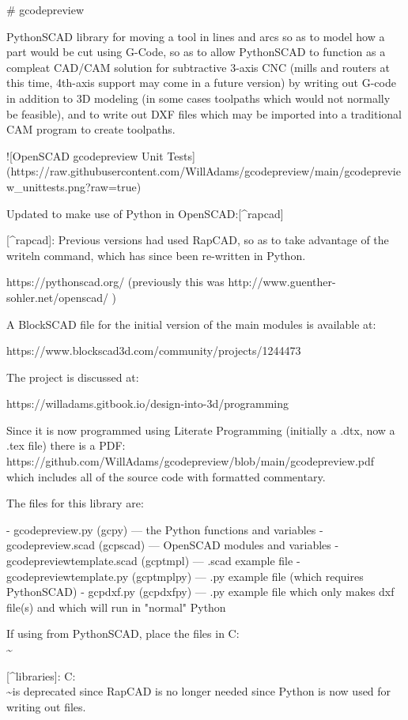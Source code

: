 \documentclass{ltxdoc}
\begin{document}
\begin{readme}
# gcodepreview

PythonSCAD library for moving a tool in lines and arcs so as to model how a part would be cut using G-Code, so as to allow PythonSCAD to function as a compleat CAD/CAM solution for subtractive 3-axis CNC (mills and routers at this time, 4th-axis support may come in a future version) by writing out G-code in addition to 3D modeling (in some cases toolpaths which would not normally be feasible), and to write out DXF files which may be imported into a traditional CAM program to create toolpaths. 

![OpenSCAD gcodepreview Unit Tests](https://raw.githubusercontent.com/WillAdams/gcodepreview/main/gcodepreview_unittests.png?raw=true)

Updated to make use of Python in OpenSCAD:[^rapcad]

[^rapcad]: Previous versions had used RapCAD, so as to take advantage of the writeln command, which has since been re-written in Python.

https://pythonscad.org/ (previously this was http://www.guenther-sohler.net/openscad/ )

A BlockSCAD file for the initial version of the 
main modules is available at:

https://www.blockscad3d.com/community/projects/1244473

The project is discussed at:

https://willadams.gitbook.io/design-into-3d/programming

Since it is now programmed using Literate Programming (initially a .dtx, now a .tex file) there is a PDF: https://github.com/WillAdams/gcodepreview/blob/main/gcodepreview.pdf which includes all of the source code with formatted commentary.

The files for this library are:

 - gcodepreview.py (gcpy) --- the Python functions and variables
 - gcodepreview.scad (gcpscad) --- OpenSCAD modules and variables
 - gcodepreviewtemplate.scad (gcptmpl) --- .scad example file
 - gcodepreviewtemplate.py (gcptmplpy) --- .py example file (which requires PythonSCAD)
 - gcpdxf.py (gcpdxfpy) --- .py example file which only makes dxf file(s) and which will run in "normal" Python

If using from PythonSCAD, place the files in C:\Users\\\~\Documents\OpenSCAD\libraries [^libraries]

[^libraries]: C:\Users\\\~\Documents\RapCAD\libraries is deprecated since RapCAD is no longer needed since Python is now used for writing out files.


\end{readme}
\end{document}
